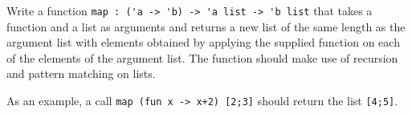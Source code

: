 Write a function
%
\lstinline{map : ('a -> 'b) -> 'a list -> 'b list}
%
that takes a function and a list as arguments and returns a new list of
the same length as the argument list with elements obtained by
applying the supplied function on each of the elements of the argument
list. The function should make use of recursion and pattern matching
on lists.

As an example, a call
%
\lstinline{map (fun x -> x+2) [2;3]}
%
should return the list \lstinline{[4;5]}.
